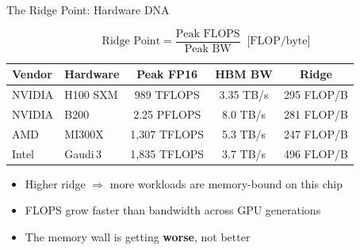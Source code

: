 \documentclass[aspectratio=169, 12pt]{beamer}
\begin{document}
\begin{frame}{The Ridge Point: Hardware DNA}

\small
\[
  \text{Ridge Point} = \frac{\text{Peak FLOPS}}{\text{Peak BW}}
  \;\;\bigl[\text{FLOP/byte}\bigr]
\]

\vspace{0.2cm}
\scriptsize
\begin{tabular}{llccc}
\toprule
\textbf{Vendor} & \textbf{Hardware} & \textbf{Peak FP16} & \textbf{HBM BW} & \textbf{Ridge} \\
\midrule
NVIDIA & H100 SXM  & 989 TFLOPS  & 3.35 TB/s & 295 FLOP/B \\
NVIDIA & B200      & 2.25 PFLOPS & 8.0 TB/s  & 281 FLOP/B \\
AMD    & MI300X    & 1,307 TFLOPS & 5.3 TB/s & 247 FLOP/B \\
Intel  & Gaudi\,3  & 1,835 TFLOPS & 3.7 TB/s & 496 FLOP/B \\
\bottomrule
\end{tabular}
\small

\vspace{0.3cm}
\begin{itemize}
  \item Higher ridge $\Rightarrow$ more workloads are memory-bound on this chip
  \item \alert{FLOPS grow faster than bandwidth across GPU generations}
  \item The memory wall is getting \textbf{worse}, not better
\end{itemize}
\end{frame}
\end{document}
